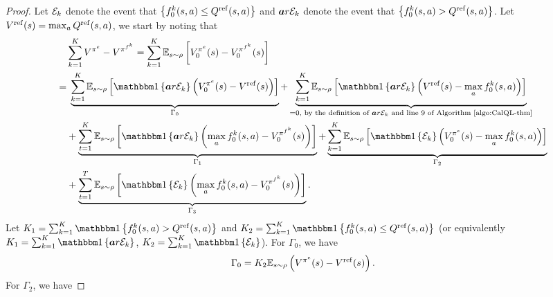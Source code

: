 \begin{proof}
    \label{proof:CalQL-main-thm}
    Let $\mathcal E_k $ denote the event that $\left\{ f_0^k(s,a)\leq Q^\mathrm{ref}(s,a) \right\}$ and $\boldsymbol{a}r{\mathcal E}_k $ denote the event that $\left\{ f_0^k(s,a) > Q^\mathrm{ref}(s,a) \right\}$. Let $V^\mathrm{ref}(s) = \max_aQ^\mathrm{ref}(s,a)$, we start by noting that
\begin{equation}
    \label{eq:conservative-main-thm-derivation0}
    \begin{split}
        &\sum_{k=1}^KV^{\pi^e}-V^{\pi^{f^k}} = \sum_{k=1}^K\bb E_{s\sim\rho}\brac{V_0^{\pi^e}(s)-V^{\pi^{f^k}}_0(s)}\\
        =&\;\underbrace{\sum_{k=1}^K\bb E_{s\sim\rho}\brac{\indicator{\mathbf{a}r{\mc E}_k}\paren{V_0^{\pi^e}(s)-V^{\mr{ref}}(s)}}}_{\Gamma_0}+\underbrace{\sum_{k=1}^K\bb E_{s\sim\rho}\brac{\indicator{\mathbf{a}r{\mc E}_k}\paren{V^{\mr{ref}}(s)-\max_a f_0^k(s,a)}}}_{=0, \text{ by the definition of }\mathbf{a}r{\mc E}_k\text{ and line 9 of Algorithm~\ref{algo:CalQL-thm}}}\\
        &+\underbrace{\sum_{t=1}^K\bb E_{s\sim\rho}\brac{\indicator{\mathbf{a}r{\mc E}_k}\paren{\max_a f_0^k(s,a)-V^{\pi^{f^k}}_0(s)}}}_{\Gamma_1}+\underbrace{\sum_{k=1}^K\bb E_{s\sim\rho}\brac{\indicator{{\mc E}_k}\paren{V_0^{\pi^e}(s)-\max_a f_0^k(s,a)}}}_{\Gamma_2}\\
        &+\underbrace{\sum_{t=1}^T\bb E_{s\sim\rho}\brac{\indicator{{\mc E}_k}\paren{\max_a f_0^k(s,a)-V^{\pi^{f^k}}_0(s)}}}_{\Gamma_3}.\\
    \end{split}
\end{equation}
Let $K_1 = \sum_{k=1}^K\indicator{f_0^k(s,a)>Q^\mr{ref}(s,a)}$ and $K_2 = \sum_{k=1}^K\indicator{f_0^k(s,a)\leq Q^\mr{ref}(s,a)}$ (or equivalently $K_1 = \sum_{k=1}^K\indicator{\mathbf{a}r{\mc E}_k}$, $K_2=\sum_{k=1}^K\indicator{{\mc E}_k}$). For $\Gamma_0$, we have
\begin{equation}
    \label{eq:derivation_gamma0}
    \Gamma_0 = K_2\mathbb E_{s\sim\rho}\left( V^{\pi^e}(s)-V^{\mathrm{ref}}(s) \right).
\end{equation}
For $\Gamma_2$, we have 


\end{proof}
